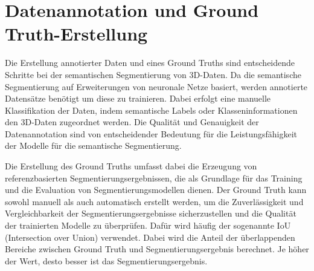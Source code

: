 \section{Datenannotation und Ground Truth-Erstellung}

Die Erstellung annotierter Daten und eines Ground Truths sind entscheidende
Schritte bei der semantischen Segmentierung von 3D-Daten. Da die semantische
Segmentierung auf Erweiterungen von neuronale Netze basiert, werden annotierte
Datensätze benötigt um diese zu trainieren. Dabei erfolgt eine manuelle
Klassifikation der Daten, indem semantische Labels oder Klasseninformationen
den 3D-Daten zugeordnet werden. Die Qualität und Genauigkeit der
Datenannotation sind von entscheidender Bedeutung für die Leistungsfähigkeit
der Modelle für die semantische Segmentierung.

Die Erstellung des Ground Truths umfasst dabei die Erzeugung von
referenzbasierten Segmentierungsergebnissen, die als Grundlage für das Training
und die Evaluation von Segmentierungsmodellen dienen. Der Ground Truth kann
sowohl manuell als auch automatisch erstellt werden, um die Zuverlässigkeit und
Vergleichbarkeit der Segmentierungsergebnisse sicherzustellen und die Qualität
der trainierten Modelle zu überprüfen. Dafür wird häufig der sogenannte IoU
(Intersection over Union) verwendet. Dabei wird die Anteil der überlappenden
Bereiche zwischen Ground Truth und Segmentierungsergebnis berechnet. Je höher
der Wert, desto besser ist das Segmentierungsergebnis.